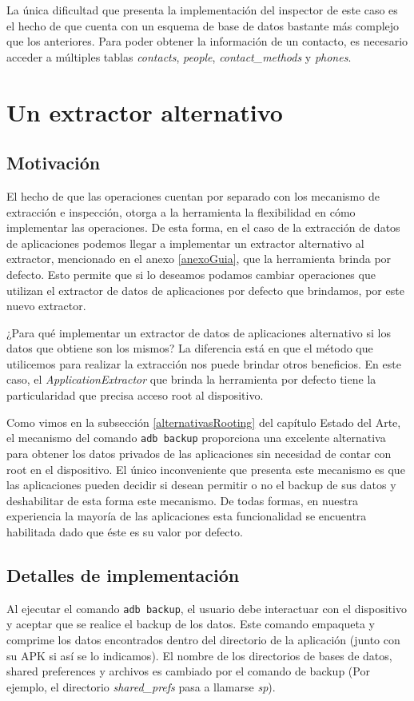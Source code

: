 La única dificultad que presenta la implementación del inspector de este caso es el hecho de que cuenta con un esquema de base de datos bastante más complejo que los anteriores. Para poder obtener la información de un contacto, es necesario acceder a múltiples tablas \emph{contacts}, \emph{people}, \emph{contact\_methods} y \emph{phones}.

\section{Un extractor alternativo}
\subsection{Motivación}
El hecho de que las operaciones cuentan por separado con los mecanismo de extracción e inspección, otorga a la herramienta la flexibilidad en cómo implementar las operaciones. De esta forma, en el caso de la extracción de datos de aplicaciones podemos llegar a implementar un extractor alternativo al extractor, mencionado en el anexo \ref{anexoGuia}, que la herramienta brinda por defecto. Esto permite que si lo deseamos podamos cambiar operaciones que utilizan el extractor de datos de aplicaciones por defecto que brindamos, por este nuevo extractor.

¿Para qué implementar un extractor de datos de aplicaciones alternativo si los datos que obtiene son los mismos? La diferencia está en que el método que utilicemos para realizar la extracción nos puede brindar otros beneficios. En este caso, el \emph{ApplicationExtractor} que brinda la herramienta por defecto tiene la particularidad que precisa acceso root al dispositivo.

Como vimos en la subsección \ref{alternativasRooting} del capítulo Estado del Arte, el mecanismo del comando \texttt{adb backup} proporciona una excelente alternativa para obtener los datos privados de las aplicaciones sin necesidad de contar con root en el dispositivo. El único inconveniente que presenta este mecanismo es que las aplicaciones pueden decidir si desean permitir o no el backup de sus datos y deshabilitar de esta forma este mecanismo. De todas formas, en nuestra experiencia la mayoría de las aplicaciones esta funcionalidad se encuentra habilitada dado que éste es su valor por defecto.

\subsection{Detalles de implementación}
Al ejecutar el comando \texttt{adb backup}, el usuario debe interactuar con el dispositivo y aceptar que se realice el backup de los datos. Este comando empaqueta y comprime los datos encontrados dentro del directorio de la aplicación (junto con su APK si así se lo indicamos). El nombre de los directorios de bases de datos, shared preferences y archivos es cambiado por el comando de backup (Por ejemplo, el directorio \emph{shared\_prefs} pasa a llamarse \emph{sp}).

